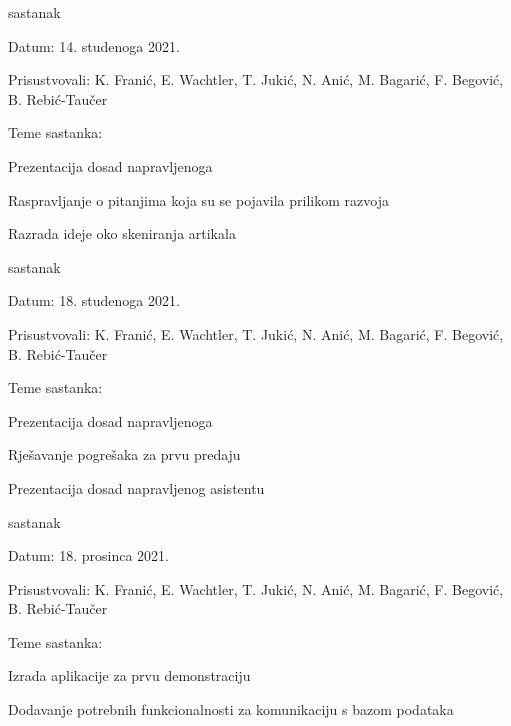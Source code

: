 \begin{packed_enum}
			\item  sastanak
			\item[] \begin{packed_item}
				\item Datum: 14. studenoga 2021.
				\item Prisustvovali: K. Franić, E. Wachtler, T. Jukić, N. Anić, M. Bagarić, F. Begović, B. Rebić-Taučer
				\item Teme sastanka:
				\begin{packed_item}
					\item  Prezentacija dosad napravljenoga
					\item  Raspravljanje o pitanjima koja su se pojavila prilikom razvoja
					\item  Razrada ideje oko skeniranja artikala
				\end{packed_item}
			\end{packed_item}
		
			\item  sastanak
			\item[] \begin{packed_item}
				\item Datum: 18. studenoga 2021.
				\item Prisustvovali: K. Franić, E. Wachtler, T. Jukić, N. Anić, M. Bagarić, F. Begović, B. Rebić-Taučer
				\item Teme sastanka:
				\begin{packed_item}
					\item  Prezentacija dosad napravljenoga
					\item  Rješavanje pogrešaka za prvu predaju
					\item  Prezentacija dosad napravljenog asistentu
				\end{packed_item}
			\end{packed_item}
		
			\item sastanak
			\item[] \begin{packed_item}
				\item Datum: 18. prosinca 2021.
				\item Prisustvovali: K. Franić, E. Wachtler, T. Jukić, N. Anić, M. Bagarić, F. Begović, B. Rebić-Taučer
				\item Teme sastanka:
				\begin{packed_item}
					\item  Izrada aplikacije za prvu demonstraciju
					\item  Dodavanje potrebnih funkcionalnosti za komunikaciju s bazom podataka
				\end{packed_item}
			\end{packed_item}
		

\end{packed_enum}
